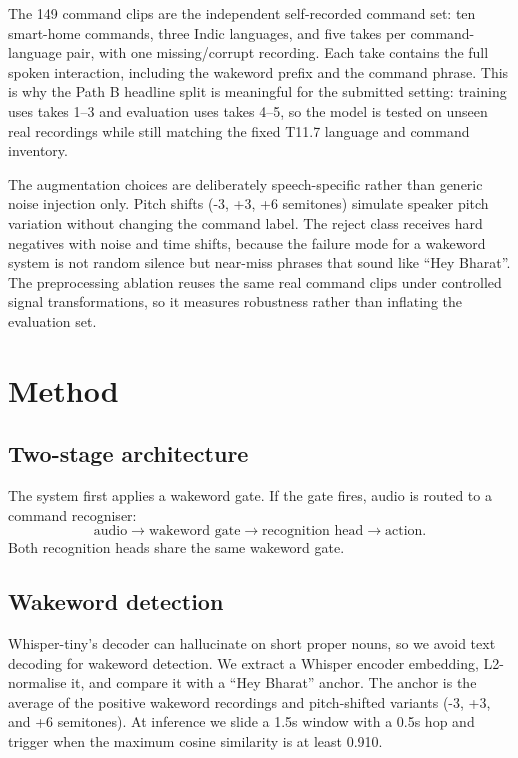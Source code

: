 \documentclass[11pt]{article}
\begin{document}
The 149 command clips are the independent self-recorded command set: ten
smart-home commands, three Indic languages, and five takes per command-language
pair, with one missing/corrupt recording. Each take contains the full spoken
interaction, including the wakeword prefix and the command phrase. This is why
the Path B headline split is meaningful for the submitted setting: training
uses takes 1--3 and evaluation uses takes 4--5, so the model is tested on
unseen real recordings while still matching the fixed T11.7 language and
command inventory.

The augmentation choices are deliberately speech-specific rather than generic
noise injection only. Pitch shifts (-3, +3, +6 semitones) simulate speaker
pitch variation without changing the command label. The reject class receives
hard negatives with noise and time shifts, because the failure mode for a
wakeword system is not random silence but near-miss phrases that sound like
``Hey Bharat''. The preprocessing ablation reuses the same real command clips
under controlled signal transformations, so it measures robustness rather than
inflating the evaluation set.

\section{Method}

\subsection{Two-stage architecture}

The system first applies a wakeword gate. If the gate fires, audio is routed to
a command recogniser:
\[
\text{audio} \rightarrow \text{wakeword gate} \rightarrow
\text{recognition head} \rightarrow \text{action}.
\]
Both recognition heads share the same wakeword gate.

\subsection{Wakeword detection}

Whisper-tiny's decoder can hallucinate on short proper nouns, so we avoid text
decoding for wakeword detection. We extract a Whisper encoder embedding,
L2-normalise it, and compare it with a ``Hey Bharat'' anchor. The anchor is
the average of the positive wakeword recordings and pitch-shifted variants
(-3, +3, and +6 semitones). At inference we slide a 1.5s window with a 0.5s
hop and trigger when the maximum cosine similarity is at least 0.910.
\end{document}

